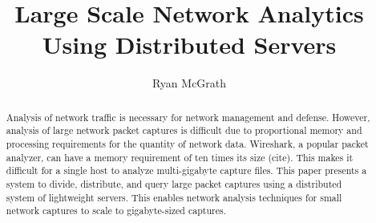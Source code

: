 \documentclass{article}
\begin{document}
\title{Large Scale Network Analytics Using Distributed Servers}
\author{Ryan McGrath}
\maketitle

\begin{abstract}

  Analysis of network traffic is necessary for network management and defense. However, analysis of large network packet captures is difficult due to proportional memory and processing requirements for the quantity of network data. Wireshark, a popular packet analyzer, can have a memory requirement of ten times its size (cite). This makes it difficult for a single host to analyze multi-gigabyte capture files.  This paper presents a system to divide, distribute, and query large packet captures using a distributed system of lightweight servers. This enables network analysis techniques for small network captures to scale to gigabyte-sized captures.


\end{abstract}
\end{document}
